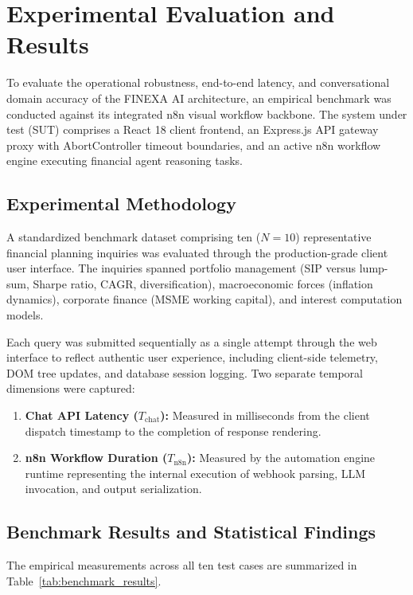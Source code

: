 
\section{Experimental Evaluation and Results}
\label{sec:evaluation}

To evaluate the operational robustness, end-to-end latency, and conversational domain accuracy of the FINEXA AI architecture, an empirical benchmark was conducted against its integrated n8n visual workflow backbone. The system under test (SUT) comprises a React 18 client frontend, an Express.js API gateway proxy with AbortController timeout boundaries, and an active n8n workflow engine executing financial agent reasoning tasks.

\subsection{Experimental Methodology}
A standardized benchmark dataset comprising ten ($N = 10$) representative financial planning inquiries was evaluated through the production-grade client user interface. The inquiries spanned portfolio management (SIP versus lump-sum, Sharpe ratio, CAGR, diversification), macroeconomic forces (inflation dynamics), corporate finance (MSME working capital), and interest computation models. 

Each query was submitted sequentially as a single attempt through the web interface to reflect authentic user experience, including client-side telemetry, DOM tree updates, and database session logging. Two separate temporal dimensions were captured:
\begin{enumerate}
    \item \textbf{Chat API Latency ($T_{\text{chat}}$):} Measured in milliseconds from the client dispatch timestamp to the completion of response rendering.
    \item \textbf{n8n Workflow Duration ($T_{\text{n8n}}$):} Measured by the automation engine runtime representing the internal execution of webhook parsing, LLM invocation, and output serialization.
\end{enumerate}

\subsection{Benchmark Results and Statistical Findings}
The empirical measurements across all ten test cases are summarized in Table~\ref{tab:benchmark_results}.

